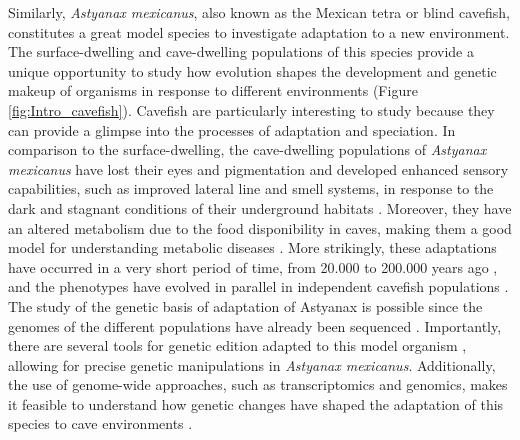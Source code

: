 Similarly, \textit{Astyanax mexicanus}, also known as the Mexican tetra or blind cavefish, constitutes a great model species to investigate adaptation to a new environment. The surface-dwelling and cave-dwelling populations of this species provide a unique opportunity to study how evolution shapes the development and genetic makeup of organisms in response to different environments (Figure \ref{fig:Intro_cavefish}). Cavefish are particularly interesting to study because they can provide a glimpse into the processes of adaptation and speciation. In comparison to the surface-dwelling, the cave-dwelling populations of \textit{Astyanax mexicanus} have lost their eyes and pigmentation and developed enhanced sensory capabilities, such as improved lateral line and smell systems, in response to the dark and stagnant conditions of their underground habitats \parencite{jeffery_emerging_2008, jeffery_astyanax_2020}. Moreover, they have an altered metabolism due to the food disponibility in caves, making them a good model for understanding metabolic diseases \parencite{rohner_cavefish_2018, krishnan_sweet_2019}. More strikingly, these adaptations have occurred in a very short period of time, from 20.000 to 200.000 years ago \parencite{fumey_evidence_2018, herman_role_2018}, and the phenotypes have evolved in parallel in independent cavefish populations \parencite{niven_evolution_2008}. The study of the genetic basis of adaptation of Astyanax is possible since the genomes of the different populations have already been sequenced \parencite{warren_chromosome-level_2021}. Importantly, there are several tools for genetic edition adapted to this model organism  \parencite{ma_genome_2015, klaassen_crispr_2018, stahl_manipulation_2019}, allowing for precise genetic manipulations in \textit{Astyanax mexicanus}.  Additionally, the use of genome-wide approaches, such as transcriptomics and genomics, makes it feasible to understand how genetic changes have shaped the adaptation of this species to cave environments \parencite{stahl_manipulation_2019, oliva_characterizing_2022}.

